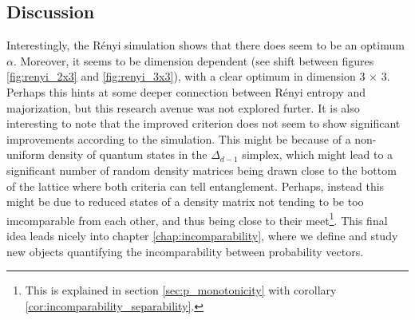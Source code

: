 \subsection{Discussion}

Interestingly, the Rényi simulation shows that there does seem to be an optimum $\alpha$. Moreover, it seems to be dimension dependent (see shift between figures \ref{fig:renyi_2x3} and \ref{fig:renyi_3x3}), with a clear optimum in dimension 3 $\times$ 3. Perhaps this hints at some deeper connection between Rényi entropy and majorization, but this research avenue was not explored furter. It is also interesting to note that the improved criterion does not seem to show significant improvements according to the simulation. This might be because of a non-uniform density of quantum states in the $\Delta_{d-1}$ simplex, which might lead to a significant number of random density matrices being drawn close to the bottom of the lattice where both criteria can tell entanglement. Perhaps, instead this might be due to reduced states of a density matrix not tending to be too imcomparable from each other, and thus being close to their meet\footnote{This is explained in section \ref{sec:p_monotonicity} with corollary \ref{cor:incomparability_separability}.}. This final idea leads nicely into chapter \ref{chap:incomparability}, where we define and study new objects quantifying the incomparability between probability vectors.